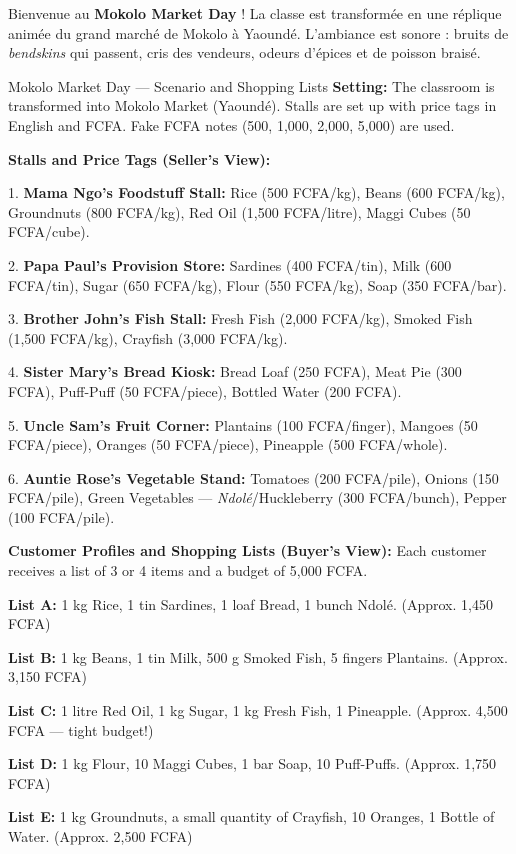 \documentclass[11pt]{article}
\newcounter{popsec}
\newcounter{popsub}
\newcommand{\courssub}[1]{%
  \stepcounter{popsub}%
  \par\vspace{9pt}\noindent{\popxbold\fontsize{11.5}{13}\selectfont\color{popink}{\color{poporange}\thepopsec.\thepopsub}\hspace{6pt}#1}\par\nopagebreak\vspace{4pt}
}
\begin{document}
\courssub{Situation}
\noindent Bienvenue au \textbf{Mokolo Market Day} ! La classe est transformée en une réplique animée du grand marché de Mokolo à Yaoundé. L'ambiance est sonore : bruits de \emph{bendskins} qui passent, cris des vendeurs, odeurs d'épices et de poisson braisé.

\begin{textebox}{Mokolo Market Day — Scenario and Shopping Lists}
\textbf{Setting:} The classroom is transformed into Mokolo Market (Yaoundé). Stalls are set up with price tags in English and FCFA. Fake FCFA notes (500, 1,000, 2,000, 5,000) are used.

\textbf{Stalls and Price Tags (Seller's View):}

1. \textbf{Mama Ngo's Foodstuff Stall:} Rice (500 FCFA/kg), Beans (600 FCFA/kg), Groundnuts (800 FCFA/kg), Red Oil (1,500 FCFA/litre), Maggi Cubes (50 FCFA/cube).

2. \textbf{Papa Paul's Provision Store:} Sardines (400 FCFA/tin), Milk (600 FCFA/tin), Sugar (650 FCFA/kg), Flour (550 FCFA/kg), Soap (350 FCFA/bar).

3. \textbf{Brother John's Fish Stall:} Fresh Fish (2,000 FCFA/kg), Smoked Fish (1,500 FCFA/kg), Crayfish (3,000 FCFA/kg).

4. \textbf{Sister Mary's Bread Kiosk:} Bread Loaf (250 FCFA), Meat Pie (300 FCFA), Puff-Puff (50 FCFA/piece), Bottled Water (200 FCFA).

5. \textbf{Uncle Sam's Fruit Corner:} Plantains (100 FCFA/finger), Mangoes (50 FCFA/piece), Oranges (50 FCFA/piece), Pineapple (500 FCFA/whole).

6. \textbf{Auntie Rose's Vegetable Stand:} Tomatoes (200 FCFA/pile), Onions (150 FCFA/pile), Green Vegetables — \emph{Ndolé}/Huckleberry (300 FCFA/bunch), Pepper (100 FCFA/pile).

\textbf{Customer Profiles and Shopping Lists (Buyer's View):}
Each customer receives a list of 3 or 4 items and a budget of 5,000 FCFA.

\textbf{List A:} 1 kg Rice, 1 tin Sardines, 1 loaf Bread, 1 bunch Ndolé. (Approx. 1,450 FCFA)

\textbf{List B:} 1 kg Beans, 1 tin Milk, 500 g Smoked Fish, 5 fingers Plantains. (Approx. 3,150 FCFA)

\textbf{List C:} 1 litre Red Oil, 1 kg Sugar, 1 kg Fresh Fish, 1 Pineapple. (Approx. 4,500 FCFA — tight budget!)

\textbf{List D:} 1 kg Flour, 10 Maggi Cubes, 1 bar Soap, 10 Puff-Puffs. (Approx. 1,750 FCFA)

\textbf{List E:} 1 kg Groundnuts, a small quantity of Crayfish, 10 Oranges, 1 Bottle of Water. (Approx. 2,500 FCFA)
\end{textebox}
\end{document}
